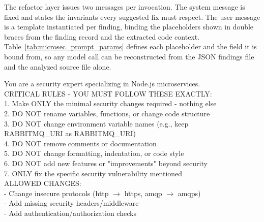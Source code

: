 \documentclass[preprint,12pt]{elsarticle}
\newcommand{\new}[1]{#1}
\begin{document}
\new{The refactor layer issues two messages per invocation. The system
message is fixed and states the invariants every suggested fix must respect.
The user message is a template instantiated per finding, binding the
placeholders shown in double braces from the finding record and the extracted
code context. Table~\ref{tab:microsec_prompt_params} defines each placeholder
and the field it is bound from, so any model call can be reconstructed from
the JSON findings file and the analyzed source file alone.}

\begin{tcolorbox}[
    colback=gray!5!white,
    colframe=gray!75!black,
    title=System message (fixed),
    fonttitle=\bfseries,
    breakable
]
\small\ttfamily
You are a security expert specializing in Node.js microservices.\\[6pt]
CRITICAL RULES - YOU MUST FOLLOW THESE EXACTLY:\\
\hspace*{1em}1. Make ONLY the minimal security changes required - nothing else\\
\hspace*{1em}2. DO NOT rename variables, functions, or change code structure\\
\hspace*{1em}3. DO NOT change environment variable names (e.g., keep\\
\hspace*{2em}RABBITMQ\_URI as RABBITMQ\_URI)\\
\hspace*{1em}4. DO NOT remove comments or documentation\\
\hspace*{1em}5. DO NOT change formatting, indentation, or code style\\
\hspace*{1em}6. DO NOT add new features or "improvements" beyond security\\
\hspace*{1em}7. ONLY fix the specific security vulnerability mentioned\\[6pt]
ALLOWED CHANGES:\\
\hspace*{1em}- Change insecure protocols (http $\rightarrow$ https, amqp $\rightarrow$ amqps)\\
\hspace*{1em}- Add missing security headers/middleware\\
\hspace*{1em}- Add authentication/authorization checks\\

\end{tcolorbox}
\end{document}

